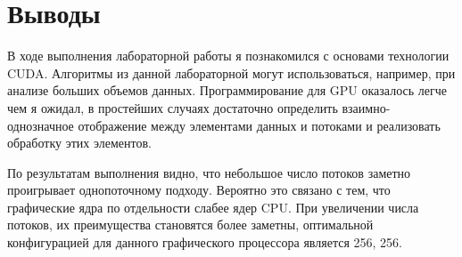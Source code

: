 \section{Выводы}
В ходе выполнения лабораторной работы я познакомился с основами технологии CUDA. Алгоритмы из данной лабораторной могут использоваться, например, при анализе больших объемов данных. Программирование для GPU оказалось легче чем я ожидал, в простейших случаях достаточно определить взаимно-однозначное отображение между элементами данных и потоками и реализовать обработку этих элементов.

По результатам выполнения видно, что небольшое число потоков заметно проигрывает однопоточному подходу. Вероятно это связано с тем, что графические ядра по отдельности слабее ядер CPU. При увеличении числа потоков, их преимущества становятся более заметны, оптимальной конфигурацией для данного графического процессора является 256, 256.

\pagebreak
